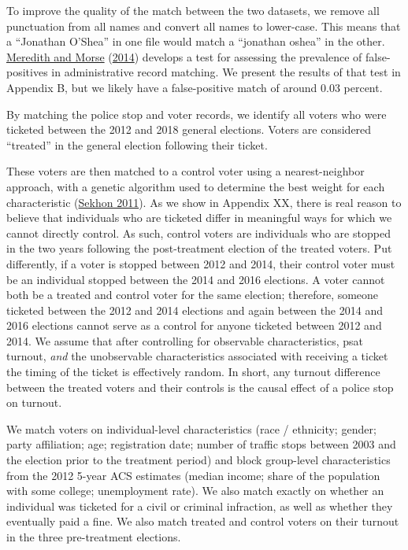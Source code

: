 \documentclass[
  12pt,
]{article}
\begin{document}
To improve the quality of the match between the two datasets, we remove all punctuation from all names and convert all names to lower-case. This means that a ``Jonathan O'Shea'' in one file would match a ``jonathan oshea'' in the other. \protect\hyperlink{ref-Meredith2014}{Meredith and Morse} (\protect\hyperlink{ref-Meredith2014}{2014}) develops a test for assessing the prevalence of false-positives in administrative record matching. We present the results of that test in Appendix B, but we likely have a false-positive match of around 0.03 percent.

By matching the police stop and voter records, we identify all voters who were ticketed between the 2012 and 2018 general elections. Voters are considered ``treated'' in the general election following their ticket.

These voters are then matched to a control voter using a nearest-neighbor approach, with a genetic algorithm used to determine the best weight for each characteristic (\protect\hyperlink{ref-Sekhon2011}{Sekhon 2011}). As we show in Appendix XX, there is real reason to believe that individuals who are ticketed differ in meaningful ways for which we cannot directly control. As such, control voters are individuals who are stopped in the two years following the post-treatment election of the treated voters. Put differently, if a voter is stopped between 2012 and 2014, their control voter must be an individual stopped between the 2014 and 2016 elections. A voter cannot both be a treated and control voter for the same election; therefore, someone ticketed between the 2012 and 2014 elections and again between the 2014 and 2016 elections cannot serve as a control for anyone ticketed between 2012 and 2014. We assume that after controlling for observable characteristics, psat turnout, \emph{and} the unobservable characteristics associated with receiving a ticket the timing of the ticket is effectively random. In short, any turnout difference between the treated voters and their controls is the causal effect of a police stop on turnout.

We match voters on individual-level characteristics (race / ethnicity; gender; party affiliation; age; registration date; number of traffic stops between 2003 and the election prior to the treatment period) and block group-level characteristics from the 2012 5-year ACS estimates (median income; share of the population with some college; unemployment rate). We also match exactly on whether an individual was ticketed for a civil or criminal infraction, as well as whether they eventually paid a fine. We also match treated and control voters on their turnout in the three pre-treatment elections.
\end{document}
